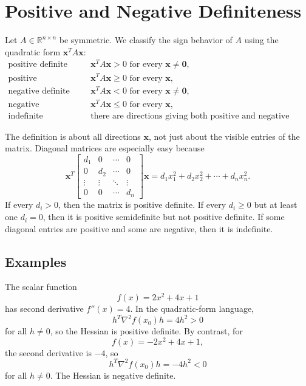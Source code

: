 \section{Positive and Negative Definiteness}
\label{mf:positive-definite}
\label{mf:positive-semidefinite}

Let \(A\in\mathbb{R}^{n\times n}\) be symmetric. We classify the sign behavior of \(A\) using the quadratic form \(\mathbf{x}^T A\mathbf{x}\):
\[
\begin{array}{ll}
\text{positive definite} & \mathbf{x}^T A\mathbf{x}>0 \text{ for every } \mathbf{x}\ne\mathbf{0},\\[0.4em]
\text{positive semidefinite} & \mathbf{x}^T A\mathbf{x}\ge 0 \text{ for every } \mathbf{x},\\[0.4em]
\text{negative definite} & \mathbf{x}^T A\mathbf{x}<0 \text{ for every } \mathbf{x}\ne\mathbf{0},\\[0.4em]
\text{negative semidefinite} & \mathbf{x}^T A\mathbf{x}\le 0 \text{ for every } \mathbf{x},\\[0.4em]
\text{indefinite} & \text{there are directions giving both positive and negative values.}
\end{array}
\]

The definition is about all directions \(\mathbf{x}\), not just about the visible entries of the matrix. Diagonal matrices are especially easy because
\[
    \mathbf{x}^T
    \begin{bmatrix}
        d_1 & 0 & \cdots & 0\\
        0 & d_2 & \cdots & 0\\
        \vdots & \vdots & \ddots & \vdots\\
        0 & 0 & \cdots & d_n
    \end{bmatrix}
    \mathbf{x}
    =d_1x_1^2+d_2x_2^2+\cdots+d_nx_n^2.
\]
If every \(d_i>0\), then the matrix is positive definite. If every \(d_i\ge 0\) but at least one \(d_i=0\), then it is positive semidefinite but not positive definite. If some diagonal entries are positive and some are negative, then it is indefinite.

\subsection*{Examples}

The scalar function
\[
    f(x)=2x^2+4x+1
\]
has second derivative \(f''(x)=4\). In the quadratic-form language,
\[
    h^T\nabla^2 f(x_0)h=4h^2>0
\]
for all \(h\ne 0\), so the Hessian is positive definite. By contrast, for
\[
    f(x)=-2x^2+4x+1,
\]
the second derivative is \(-4\), so
\[
    h^T\nabla^2 f(x_0)h=-4h^2<0
\]
for all \(h\ne 0\). The Hessian is negative definite.

